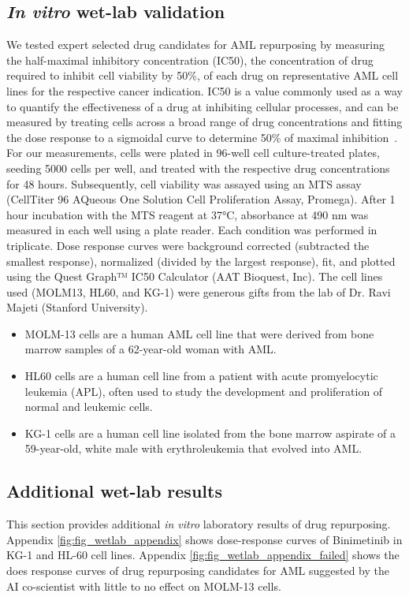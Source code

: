 \subsection{\textit{In vitro} wet-lab validation}
\label{sec:eval_wetlab}
We tested expert selected drug candidates for AML repurposing by measuring the half-maximal inhibitory concentration (IC50), the concentration of drug required to inhibit cell viability by 50\%, of each drug on representative AML cell lines for the respective cancer indication. IC50 is a value commonly used as a way to quantify the effectiveness of a drug at inhibiting cellular processes, and can be measured by treating cells across a broad range of drug concentrations and fitting the dose response to a sigmoidal curve to determine 50\% of maximal inhibition~\cite{sebaugh2011guidelines}. For our measurements, cells were plated in 96-well cell culture-treated plates, seeding 5000 cells per well, and treated with the respective drug concentrations for 48 hours. Subsequently, cell viability was assayed using an MTS assay (CellTiter 96 AQueous One Solution Cell Proliferation Assay, Promega). After 1 hour incubation with the MTS reagent at 37°C, absorbance at 490 nm was measured in each well using a plate reader. Each condition was performed in triplicate. Dose response curves were background corrected (subtracted the smallest response), normalized (divided by the largest response), fit, and plotted using the Quest Graph™ IC50 Calculator (AAT Bioquest, Inc). The cell lines used (MOLM13, HL60, and KG-1) were generous gifts from the lab of Dr. Ravi Majeti (Stanford University).
\begin{itemize}
    \item MOLM-13 cells are a human AML cell line that were derived from bone marrow samples of a 62-year-old woman with AML.
    \item HL60 cells are a human cell line from a patient with acute promyelocytic leukemia (APL), often used to study the development and proliferation of normal and leukemic cells. 
    \item KG-1 cells are a human cell line isolated from the bone marrow aspirate of a 59-year-old, white male with erythroleukemia that evolved into AML.
\end{itemize}


\subsection{Additional wet-lab results}
\label{sec:result_wetlab}
This section provides additional \textit{in vitro} laboratory results of drug repurposing. Appendix \cref{fig:fig_wetlab_appendix} shows dose-response curves of Binimetinib in KG-1 and HL-60 cell lines. Appendix \cref{fig:fig_wetlab_appendix_failed} shows the does response curves of drug repurposing candidates for AML suggested by the AI co-scientist with little to no effect on MOLM-13 cells.

